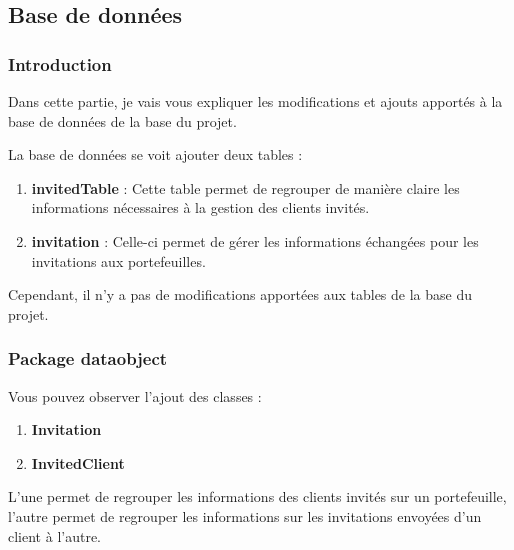 \subsection{Base de données}

\subsubsection{Introduction}

\begin{flushleft}
Dans cette partie, je vais vous expliquer les modifications et ajouts apportés à la base de données de la base du projet. 
\end{flushleft}

\begin{flushleft}
La base de données se voit ajouter deux tables :
\end{flushleft}

\begin{enumerate}
\item \textbf{invitedTable} :\newline
Cette table permet de regrouper de manière claire les informations nécessaires à la gestion des clients invités.
\item \textbf{invitation} :\newline
Celle-ci permet de gérer les informations échangées pour les invitations aux portefeuilles.
\end{enumerate}

\begin{flushleft}
Cependant, il n'y a pas de modifications apportées aux tables de la base du projet.
\end{flushleft}


\subsubsection{Package dataobject}

\begin{flushleft}
Vous pouvez observer l'ajout des classes :
\end{flushleft}
\begin{enumerate}[-]
\item \textbf{Invitation}
\item \textbf{InvitedClient}
\end{enumerate}

\begin{flushleft}
L'une permet de regrouper les informations des clients invités sur un portefeuille, l'autre permet de regrouper les informations sur les invitations envoyées d'un client à l'autre.
\end{flushleft}

